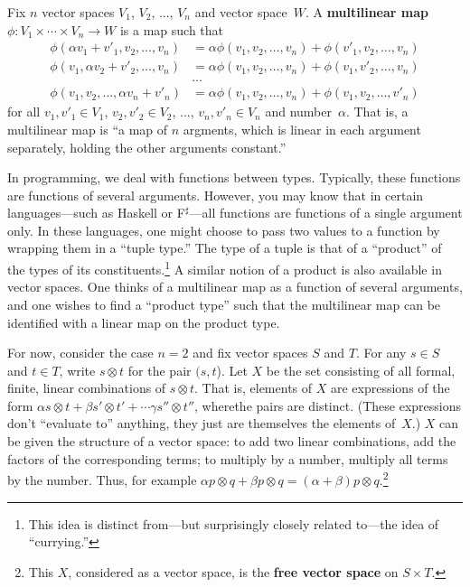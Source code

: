 \documentclass[10pt, a4paper, twocolumn]{article}
\newcommand{\defn}[1]{\textbf{#1}}
\begin{document}
Fix $n$ vector spaces $V_1$, $V_2$, ..., $V_n$ and vector space~$W$. A
\defn{multilinear map} $\phi:V_1\times\dotsb\times V_n \to W$ is a map such that
{\small\begin{equation*}
  \begin{aligned}
  \phi(\alpha v_1 + v'_1, v_2, \dotsc, v_n) &= \alpha \phi(v_1, v_2, \dotsc, v_n) + \phi(v'_1, v_2,
  \dotsc, v_n) \\
  \phi(v_1, \alpha v_2 + v'_2, \dotsc, v_n) &= \alpha \phi(v_1, v_2, \dotsc, v_n) + \phi(v_1, v'_2,
  \dotsc, v_n) \\
  & \dots \\
  \phi(v_1, v_2, \dotsc, \alpha v_n + v'_n) &= \alpha \phi(v_1, v_2, \dotsc, v_n) + \phi(v_1, v_2,
  \dotsc, v'_n)  
  \end{aligned}
  \end{equation*}}%
for all $v_1, v'_1\in V_1$, $v_2, v'_2 \in V_2$, ..., $v_n, v'_n \in V_n$ and
number~$\alpha$. That is, a multilinear map is “a map of $n$ argments, which is
linear in each argument separately, holding the other arguments constant.”

In programming, we deal with functions between types. Typically, these functions
are functions of several arguments. However, you may know that in certain
languages---such as Haskell or F$^\sharp$---all functions are functions of a single argument
only. In these languages, one might choose to pass two values to a function by
wrapping them in a “tuple type.” The type of a tuple is that of a “product” of
the types of its constituents.\footnote{This idea is distinct from---but
  surprisingly closely related to---the idea of “currying.”} A similar notion of a
product is also available in vector spaces. One thinks of a multilinear map as a
function of several arguments, and one wishes to find a “product type” such that
the multilinear map can be identified with a linear map on the product type.

For now, consider the case $n=2$ and fix vector spaces $S$ and $T$. For any $s\in
S$ and $t\in T$, write $s \otimes t$ for the pair $(s, t$). Let $X$ be the set
consisting of all formal, finite, linear combinations of $s \otimes t$. That is,
elements of $X$ are expressions of the form $\alpha s\otimes t + \beta s'\otimes t' + \dotsb \gamma s'' \otimes
t''$, wherethe pairs are distinct. (These expressions don't “evaluate to”
anything, they just are themselves the elements of~$X$.) $X$ can be given the
structure of a vector space: to add two linear combinations, add the factors of
the corresponding terms; to multiply by a number, multiply all terms by the
number. Thus, for example $\alpha p\otimes q + \beta p\otimes q = (\alpha + \beta) p\otimes q$.\footnote{This $X$,
  considered as a vector space, is the \defn{free vector space} on $S\times T$.}
\end{document}
